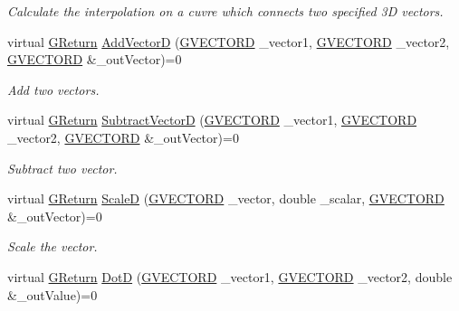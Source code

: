 \begin{DoxyCompactItemize}
\begin{DoxyCompactList}\small\item\em Calculate the interpolation on a cuvre which connects two specified 3D vectors. \end{DoxyCompactList}\item 
virtual \mbox{\hyperlink{namespace_g_w_a67a839e3df7ea8a5c5686613a7a3de21}{G\+Return}} \mbox{\hyperlink{class_g_w_1_1_m_a_t_h_1_1_g_vector_a3c795ce49b0b71dc83528e3b89a1b1ff}{Add\+VectorD}} (\mbox{\hyperlink{struct_g_w_1_1_m_a_t_h_1_1_g_v_e_c_t_o_r_d}{G\+V\+E\+C\+T\+O\+RD}} \+\_\+vector1, \mbox{\hyperlink{struct_g_w_1_1_m_a_t_h_1_1_g_v_e_c_t_o_r_d}{G\+V\+E\+C\+T\+O\+RD}} \+\_\+vector2, \mbox{\hyperlink{struct_g_w_1_1_m_a_t_h_1_1_g_v_e_c_t_o_r_d}{G\+V\+E\+C\+T\+O\+RD}} \&\+\_\+out\+Vector)=0
\begin{DoxyCompactList}\small\item\em Add two vectors. \end{DoxyCompactList}\item 
virtual \mbox{\hyperlink{namespace_g_w_a67a839e3df7ea8a5c5686613a7a3de21}{G\+Return}} \mbox{\hyperlink{class_g_w_1_1_m_a_t_h_1_1_g_vector_ae060722225a95e48c83c9c4adead93e0}{Subtract\+VectorD}} (\mbox{\hyperlink{struct_g_w_1_1_m_a_t_h_1_1_g_v_e_c_t_o_r_d}{G\+V\+E\+C\+T\+O\+RD}} \+\_\+vector1, \mbox{\hyperlink{struct_g_w_1_1_m_a_t_h_1_1_g_v_e_c_t_o_r_d}{G\+V\+E\+C\+T\+O\+RD}} \+\_\+vector2, \mbox{\hyperlink{struct_g_w_1_1_m_a_t_h_1_1_g_v_e_c_t_o_r_d}{G\+V\+E\+C\+T\+O\+RD}} \&\+\_\+out\+Vector)=0
\begin{DoxyCompactList}\small\item\em Subtract two vector. \end{DoxyCompactList}\item 
virtual \mbox{\hyperlink{namespace_g_w_a67a839e3df7ea8a5c5686613a7a3de21}{G\+Return}} \mbox{\hyperlink{class_g_w_1_1_m_a_t_h_1_1_g_vector_a43e69ae3ed90a6ade1d6137409766fbe}{ScaleD}} (\mbox{\hyperlink{struct_g_w_1_1_m_a_t_h_1_1_g_v_e_c_t_o_r_d}{G\+V\+E\+C\+T\+O\+RD}} \+\_\+vector, double \+\_\+scalar, \mbox{\hyperlink{struct_g_w_1_1_m_a_t_h_1_1_g_v_e_c_t_o_r_d}{G\+V\+E\+C\+T\+O\+RD}} \&\+\_\+out\+Vector)=0
\begin{DoxyCompactList}\small\item\em Scale the vector. \end{DoxyCompactList}\item 
virtual \mbox{\hyperlink{namespace_g_w_a67a839e3df7ea8a5c5686613a7a3de21}{G\+Return}} \mbox{\hyperlink{class_g_w_1_1_m_a_t_h_1_1_g_vector_ad159973274edb5ded88a21f2e196c3ab}{DotD}} (\mbox{\hyperlink{struct_g_w_1_1_m_a_t_h_1_1_g_v_e_c_t_o_r_d}{G\+V\+E\+C\+T\+O\+RD}} \+\_\+vector1, \mbox{\hyperlink{struct_g_w_1_1_m_a_t_h_1_1_g_v_e_c_t_o_r_d}{G\+V\+E\+C\+T\+O\+RD}} \+\_\+vector2, double \&\+\_\+out\+Value)=0

\end{DoxyCompactItemize}
